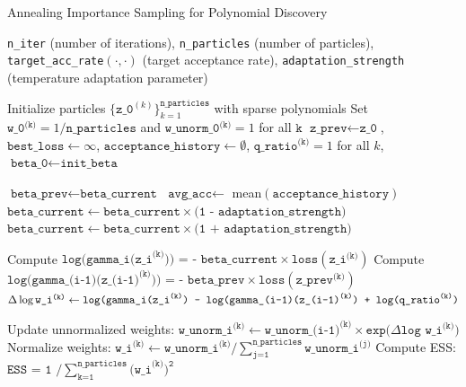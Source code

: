 \documentclass[11pt]{article}
\begin{document}
\begin{algorithm}
	\caption{Annealing Importance Sampling for Polynomial Discovery}
	\label{alg:annealing-is}
	\begin{algorithmic}[1]
		\Require \texttt{n\_iter} (number of iterations), \texttt{n\_particles} (number of particles), \texttt{target\_acc\_rate}$(\cdot,\cdot)$ (target acceptance rate), \texttt{adaptation\_strength} (temperature adaptation parameter)
		
		\State Initialize particles $\{\texttt{z\_0}^{(k)}\}_{k=1}^{\texttt{n\_particles}}$ with sparse polynomials
		\State Set $\texttt{w\_0}^{\texttt{(k)}} = 1/\texttt{n\_particles}$ and $\texttt{w\_unorm\_0}^{\texttt{(k)}} = 1$ for all $\texttt k$ 
		\State $\texttt{z\_prev} \leftarrow \texttt{z\_0}$, $\texttt{best\_loss} \leftarrow \infty$, $\texttt{acceptance\_history} \leftarrow \emptyset$, $\texttt{q\_ratio}^{\texttt{(k)}}=1$ for all $k$, $\texttt{beta\_0} \leftarrow \texttt{init\_beta}$ 
		
		 
		\State $\texttt{beta\_{prev}} \leftarrow \texttt{beta\_current}$
		\State $\texttt{avg\_acc} \leftarrow$ mean$(\texttt{acceptance\_history})$ 
		\State $\texttt{beta\_current} \leftarrow \texttt{beta\_current} \times \texttt{(1 - adaptation\_strength)}$
		\State $\texttt{beta\_current} \leftarrow \texttt{beta\_current} \times \texttt{(1 + adaptation\_strength)}$
		\EndIf
		
		 
		\State Compute $\texttt{log(gamma\_i(z\_i}^{\texttt{(k)}} \texttt{)) = - beta\_current} \times \texttt{loss}(\texttt{z\_i}^{\texttt{(k)}}) $
		\State Compute $\texttt{log(gamma\_(i-1)}(\texttt{z\_(i-1)}^{\texttt{(k)}}\texttt{)) = - beta\_prev} \times \texttt{loss}(\texttt{z\_prev}^{\texttt{(k)}})$
		\State $\Delta \log \texttt{w\_i}^{\texttt{(k)}} \leftarrow \texttt{log(gamma\_i(\texttt{z\_i}}^{\texttt{(k)}}  \texttt{) - log(gamma\_(i-1)(z\_(i-1)}^{\texttt{(k)}} \texttt{) + log(q\_ratio}^{\texttt{(k)}}\texttt)$
		\EndFor
		
		\State Update unnormalized weights: $\texttt{w\_unorm\_i}^{\texttt{(k)}} \leftarrow \texttt{w\_unorm\_(i-1)}^{\texttt{(k)}} \times \texttt{exp(}\Delta \texttt{log w\_i}^{\texttt{(k)}}\texttt)$
		\State Normalize weights: $\texttt{w\_i}^{\texttt{(k)}} \leftarrow \texttt{w\_unorm\_i}^{\texttt{(k)}} \texttt/ \sum_{\texttt{j=1}}^{\texttt{n\_particles}} \texttt{w\_unorm\_i}^{\texttt{(j)}}$
		\State Compute ESS: $\texttt{ESS = 1 /} \sum_{\texttt{k=1}}^{\texttt{n\_particles}} \texttt{(w\_i}^{\texttt{(k)}})^\texttt2$
		

\end{algorithmic}
\end{algorithm}
\end{document}
